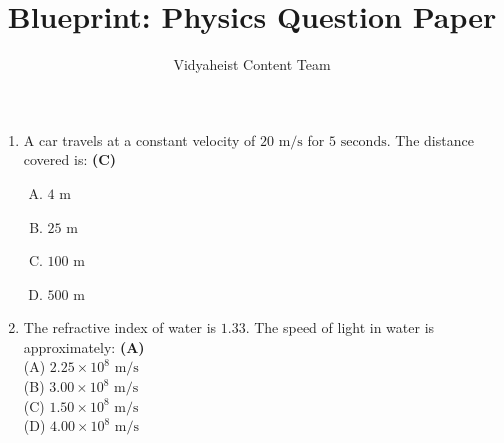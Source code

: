 \documentclass{article}
\begin{document}
\title{Blueprint: Physics Question Paper}
\author{Vidyaheist Content Team}
\date{}
\maketitle

\begin{enumerate}

    \item A car travels at a constant velocity of $20 \text{ m/s}$ for $5 \text{ seconds}$. The distance covered is: \hfill \textbf{(C)}
    \begin{enumerate}[(A)]
        \item $4 \text{ m}$
        \item $25 \text{ m}$
        \item $100 \text{ m}$
        \item $500 \text{ m}$
    \end{enumerate}

    \item The refractive index of water is $1.33$. The speed of light in water is approximately: \hfill \textbf{(A)}
    \\(A) $2.25 \times 10^8 \text{ m/s}$
    \\(B) $3.00 \times 10^8 \text{ m/s}$
    \\(C) $1.50 \times 10^8 \text{ m/s}$
    \\(D) $4.00 \times 10^8 \text{ m/s}$

\end{enumerate}
\end{document}
